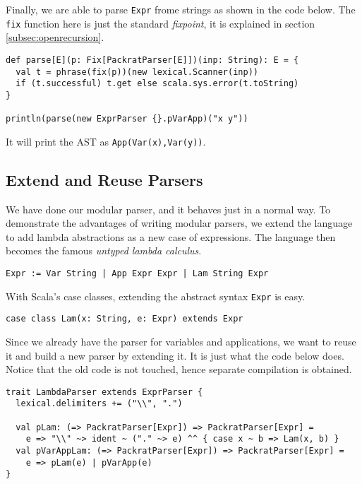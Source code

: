 Finally, we are able to parse \lstinline{Expr} frome strings as shown in the code below. The \lstinline{fix} function here is just the standard \textit{fixpoint}, it is explained in section \ref{subsec:openrecursion}.

\begin{lstlisting}
def parse[E](p: Fix[PackratParser[E]])(inp: String): E = {
  val t = phrase(fix(p))(new lexical.Scanner(inp))
  if (t.successful) t.get else scala.sys.error(t.toString)
}

println(parse(new ExprParser {}.pVarApp)("x y"))
\end{lstlisting}

It will print the AST as \lstinline{App(Var(x),Var(y))}.

\subsection{Extend and Reuse Parsers}\label{subsec:overview-extend}

We have done our modular parser, and it behaves just in a normal way. To demonstrate the advantages of writing modular parsers, we extend the language to add lambda abstractions as a new case of expressions. The language then becomes the famous \textit{untyped lambda calculus}.

\begin{lstlisting}[language=PlainCode]
Expr := Var String | App Expr Expr | Lam String Expr
\end{lstlisting}

With Scala's case classes, extending the abstract syntax \lstinline{Expr} is easy.

\begin{lstlisting}
case class Lam(x: String, e: Expr) extends Expr
\end{lstlisting}

Since we already have the parser for variables and applications, we want to reuse it and build a new parser by extending it. It is just what the code below does. Notice that the old code is not touched, hence separate compilation is obtained.

\begin{lstlisting}
trait LambdaParser extends ExprParser {
  lexical.delimiters += ("\\", ".")

  val pLam: (=> PackratParser[Expr]) => PackratParser[Expr] =
    e => "\\" ~> ident ~ ("." ~> e) ^^ { case x ~ b => Lam(x, b) }
  val pVarAppLam: (=> PackratParser[Expr]) => PackratParser[Expr] =
    e => pLam(e) | pVarApp(e)
}
\end{lstlisting}

